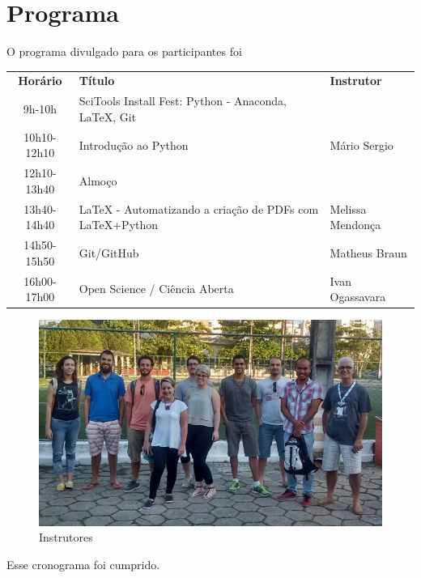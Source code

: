 \documentclass[12pt]{article}
\begin{document}
\newpage

\section*{Programa}

O programa divulgado para os participantes foi

\begin{tabular}{cp{}l}
  \textbf{Horário} & \textbf{Título} & \textbf{Instrutor} \\
  9h-10h & SciTools Install Fest: Python - Anaconda, LaTeX, Git & \\
  10h10-12h10 & Introdução ao Python & Mário Sergio \\
  12h10-13h40 & Almoço \\
  13h40-14h40 & LaTeX - Automatizando a criação de PDFs com LaTeX+Python & Melissa Mendonça \\
  14h50-15h50 & Git/GitHub & Matheus Braun \\
  16h00-17h00 & Open Science / Ciência Aberta & Ivan Ogassavara \\
\end{tabular}

\begin{figure}[!htb]
\includegraphics[width=\textwidth]{../../media/photos/pre4-cut}
\caption{Instrutores}
\end{figure}

Esse cronograma foi cumprido.




\end{document}
